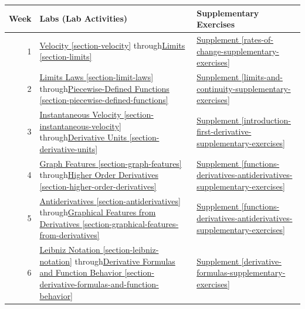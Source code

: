 \documentclass[10pt,oneside,]{book}
\theoremstyle{plain}
\theoremstyle{definition}
\numberwithin{equation}{section}
\begin{document}
\newline{}\begin{tabular}{rp{3in}p{1.1in}}
\toprule
Week&Labs (Lab Activities)&Supplementary Exercises\\
\midrule
1&\hyperref[section-velocity]{Velocity \ref{section-velocity}} through\newline{}\hyperref[section-limits]{Limits \ref{section-limits}}&\hyperref[rates-of-change-supplementary-exercises]{Supplement \ref{rates-of-change-supplementary-exercises}}\\
\midrule
2&\hyperref[section-limit-laws]{Limits Laws \ref{section-limit-laws}} through\newline{}\hyperref[section-piecewise-defined-functions]{Piecewise-Defined Functions \ref{section-piecewise-defined-functions}}&\hyperref[limits-and-continuity-supplementary-exercises]{Supplement \ref{limits-and-continuity-supplementary-exercises}}\\
\midrule
3&\hyperref[section-instantaneous-velocity]{Instantaneous Velocity \ref{section-instantaneous-velocity}} through\newline{}\hyperref[section-derivative-units]{Derivative Units \ref{section-derivative-units}}&\hyperref[introduction-first-derivative-supplementary-exercises]{Supplement \ref{introduction-first-derivative-supplementary-exercises}}\\
\midrule
4&\hyperref[section-graph-features]{Graph Features \ref{section-graph-features}} through\newline{}\hyperref[section-higher-order-derivatives]{Higher Order Derivatives \ref{section-higher-order-derivatives}}&\hyperref[functions-derivatives-antiderivatives-supplementary-exercises]{Supplement \ref{functions-derivatives-antiderivatives-supplementary-exercises}}\\
\midrule
5&\hyperref[section-antiderivatives]{Antiderivatives \ref{section-antiderivatives}} through\newline{}\hyperref[section-graphical-features-from-derivatives]{Graphical Features from Derivatives \ref{section-graphical-features-from-derivatives}}&\hyperref[functions-derivatives-antiderivatives-supplementary-exercises]{Supplement \ref{functions-derivatives-antiderivatives-supplementary-exercises}}\\
\midrule
6&\hyperref[section-leibniz-notation]{Leibniz Notation \ref{section-leibniz-notation}} through\newline{}\hyperref[section-derivative-formulas-and-function-behavior]{Derivative Formulas and Function Behavior \ref{section-derivative-formulas-and-function-behavior}}&\hyperref[derivative-formulas-supplementary-exercises]{Supplement \ref{derivative-formulas-supplementary-exercises}}\\

\end{tabular}
\end{document}
